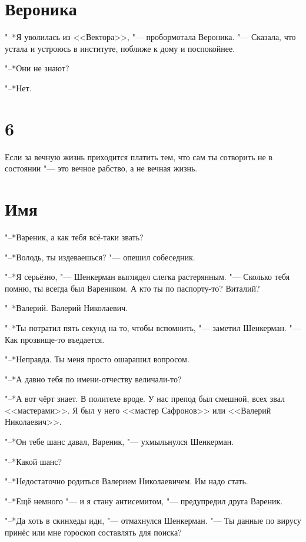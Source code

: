 \section{Вероника}

"--*Я уволилась из <<Вектора>>, "--- пробормотала Вероника.
"--- Сказала, что устала и устроюсь в институте, поближе к дому и поспокойнее.

"--*Они не знают?

"--*Нет.

\section{6}

Если за вечную жизнь приходится платить тем, что сам ты сотворить не в состоянии "--- это вечное рабство, а не вечная жизнь.

\section{Имя}

"--*Вареник, а как тебя всё-таки звать?

"--*Володь, ты издеваешься? "--- опешил собеседник.

"--*Я серьёзно, "--- Шенкерман выглядел слегка растерянным.
"--- Сколько тебя помню, ты всегда был Вареником.
А кто ты по паспорту-то?
Виталий?

"--*Валерий.
Валерий Николаевич.

"--*Ты потратил пять секунд на то, чтобы вспомнить, "--- заметил Шенкерман. 
"--- Как прозвище-то въедается.

"--*Неправда.
Ты меня просто ошарашил вопросом.

"--*А давно тебя по имени-отчеству величали-то?

"--*А вот чёрт знает.
В политехе вроде.
У нас препод был смешной, всех звал <<мастерами>>.
Я был у него <<мастер Сафронов>> или <<Валерий Николаевич>>.

"--*Он тебе шанс давал, Вареник, "--- ухмыльнулся Шенкерман.

"--*Какой шанс?

"--*Недостаточно родиться Валерием Николаевичем.
Им надо стать.

"--*Ещё немного "--- и я стану антисемитом, "--- предупредил друга Вареник.

"--*Да хоть в скинхеды иди, "--- отмахнулся Шенкерман.
"--- Ты данные по вирусу принёс или мне гороскоп составлять для поиска?


